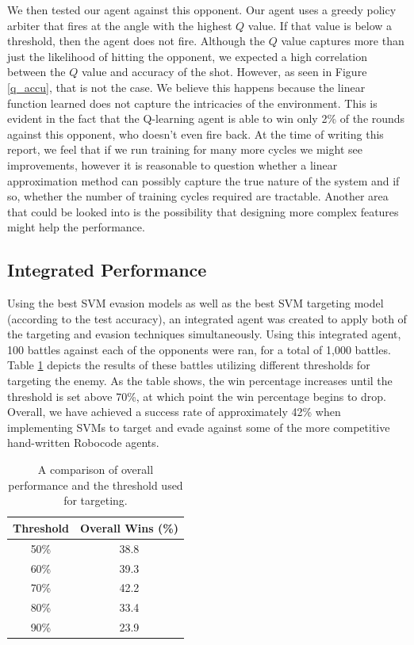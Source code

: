 \documentclass{article}
\theoremstyle{plain}
\theoremstyle{definition}
\theoremstyle{remark}
\begin{document}
We then tested our agent against this opponent. Our agent uses a greedy policy arbiter that fires at the angle with the highest $Q$ value. If that value is below a threshold, then the agent does not fire. Although the $Q$ value captures more than just the likelihood of hitting the opponent, we expected a high correlation between the $Q$ value and accuracy of the shot. However, as seen in Figure \ref{q_accu}, that is not the case. We believe this happens because the linear function learned does not capture the intricacies of the environment. This is evident in the fact that the Q-learning agent is able to win only 2\% of the rounds against this opponent, who doesn't even fire back. At the time of writing this report, we feel that if we run training for many more cycles we might see improvements, however it is reasonable to question whether a linear approximation method can possibly capture the true nature of the system and if so, whether the number of training cycles required are tractable. Another area that could be looked into is the possibility that designing more complex features might help the performance.

\subsection*{Integrated Performance}
Using the best SVM evasion models as well as the best SVM targeting model (according to the test accuracy), an integrated agent was created to apply both of the targeting and evasion techniques simultaneously. Using this integrated agent, 100 battles against each of the opponents were ran, for a total of 1,000 battles. Table \ref{svm_thresh} depicts the results of these battles utilizing different thresholds for targeting the enemy. As the table shows, the win percentage increases until the threshold is set above 70\%, at which point the win percentage begins to drop. Overall, we have achieved a success rate of approximately 42\% when implementing SVMs to target and evade against some of the more competitive hand-written Robocode agents. 

\begin{table}[h]
\centering
    \begin{tabular}{|c|c|}
        \hline
        \bf{Threshold} & \bf{Overall Wins (\%) }\\ \hline
        50\%      & 38.8   \\ \hline
        60\%      & 39.3   \\ \hline
        70\%      & 42.2   \\ \hline
        80\%      & 33.4   \\ \hline
        90\%      & 23.9   \\
        \hline
    \end{tabular}
\label{svm_thresh}
\caption{A comparison of overall performance and the threshold used for targeting.}
\end{table}
\end{document}
